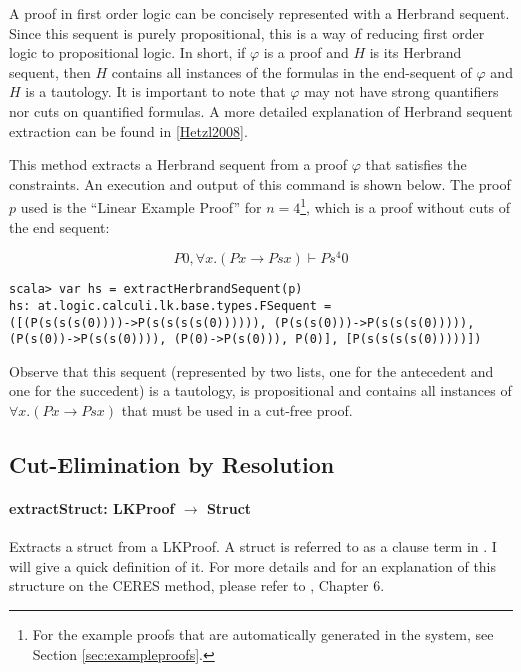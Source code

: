 \documentclass[a4paper, 11pt]{report}
\begin{document}
A proof in first order logic can be concisely represented with a Herbrand
sequent. Since this sequent is purely propositional, this is a way of reducing
first order logic to propositional logic. In short, if $\varphi$ is a proof and
$H$ is its Herbrand sequent, then $H$ contains all instances of the formulas in
the end-sequent of $\varphi$ and $H$ is a tautology. It is important to note
that $\varphi$ may not have strong quantifiers nor cuts on quantified formulas.
A more detailed explanation of Herbrand sequent extraction can be found in
\ref{Hetzl2008}. 

This method extracts a Herbrand sequent from a proof $\varphi$ that satisfies
the constraints. 
An execution and output of this command is shown below. The proof $p$ used is the
``Linear Example Proof'' for $n=4$\footnote{For the example proofs that are
automatically generated in the system, see Section \ref{sec:exampleproofs}.},
which is a proof without cuts of the end sequent:

$$P0, \forall x. (Px \rightarrow Psx) \vdash Ps^4 0$$

\begin{lstlisting}
scala> var hs = extractHerbrandSequent(p)
hs: at.logic.calculi.lk.base.types.FSequent =
([(P(s(s(s(0))))->P(s(s(s(s(0)))))), (P(s(s(0)))->P(s(s(s(0))))),
(P(s(0))->P(s(s(0)))), (P(0)->P(s(0))), P(0)], [P(s(s(s(s(0)))))])
\end{lstlisting}

Observe that this sequent (represented by two lists, one for the antecedent and
one for the succedent) is a tautology, is propositional and contains all
instances of $\forall x. (Px \rightarrow Psx)$ that must be used in a cut-free
proof.

\subsection{Cut-Elimination by Resolution}


\paragraph{\textbf{extractStruct: LKProof $\rightarrow$ Struct}}
Extracts a struct from a LKProof. A struct is referred to as a clause term in
\cite{Baaz2011}. I will give a quick definition of it. For more details and
for an explanation of this structure on the CERES method, please refer to
\cite{Baaz2011}, Chapter 6.
\end{document}
